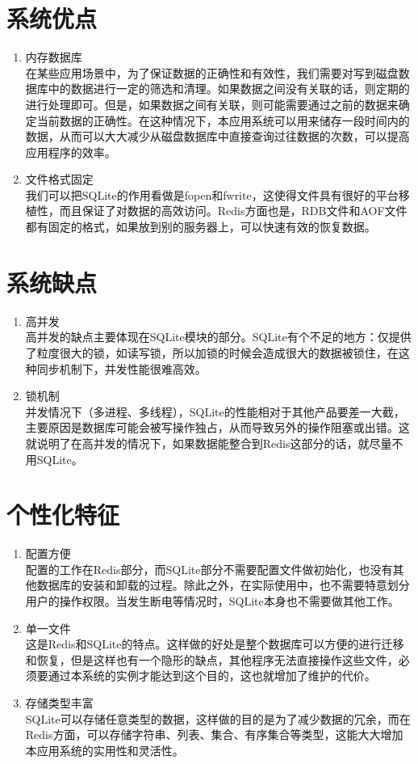 \documentclass{zjutthesis}
\begin{document}
\section{系统优点}
\begin{enumerate}[label=\arabic*.]
\item{内存数据库\\
在某些应用场景中，为了保证数据的正确性和有效性，我们需要对写到磁盘数据库中的数据进行一定的筛选和清理。如果数据之间没有关联的话，则定期的进行处理即可。但是，如果数据之间有关联，则可能需要通过之前的数据来确定当前数据的正确性。在这种情况下，本应用系统可以用来储存一段时间内的数据，从而可以大大减少从磁盘数据库中直接查询过往数据的次数，可以提高应用程序的效率。}

\item{文件格式固定\\
我们可以把SQLite的作用看做是fopen和fwrite，这使得文件具有很好的平台移植性，而且保证了对数据的高效访问。Redis方面也是，RDB文件和AOF文件都有固定的格式，如果放到别的服务器上，可以快速有效的恢复数据。}
\end{enumerate}

\section{系统缺点}
\begin{enumerate}[label=\arabic*.]
\item{高并发\\
高并发的缺点主要体现在SQLite模块的部分。SQLite有个不足的地方：仅提供了粒度很大的锁，如读写锁，所以加锁的时候会造成很大的数据被锁住，在这种同步机制下，并发性能很难高效。}

\item{锁机制\\
并发情况下（多进程、多线程），SQLite的性能相对于其他产品要差一大截，主要原因是数据库可能会被写操作独占，从而导致另外的操作阻塞或出错。这就说明了在高并发的情况下，如果数据能整合到Redis这部分的话，就尽量不用SQLite。
}
\end{enumerate}

\section{个性化特征}
\begin{enumerate}[label=\arabic*.]
\item{配置方便\\
配置的工作在Redis部分，而SQLite部分不需要配置文件做初始化，也没有其他数据库的安装和卸载的过程。除此之外，在实际使用中，也不需要特意划分用户的操作权限。当发生断电等情况时，SQLite本身也不需要做其他工作。
}
\item{单一文件\\
这是Redis和SQLite的特点。这样做的好处是整个数据库可以方便的进行迁移和恢复，但是这样也有一个隐形的缺点，其他程序无法直接操作这些文件，必须要通过本系统的实例才能达到这个目的，这也就增加了维护的代价。
}
\item{存储类型丰富\\
SQLite可以存储任意类型的数据，这样做的目的是为了减少数据的冗余，而在Redis方面，可以存储字符串、列表、集合、有序集合等类型，这能大大增加本应用系统的实用性和灵活性。
}
\end{enumerate}
\end{document}
